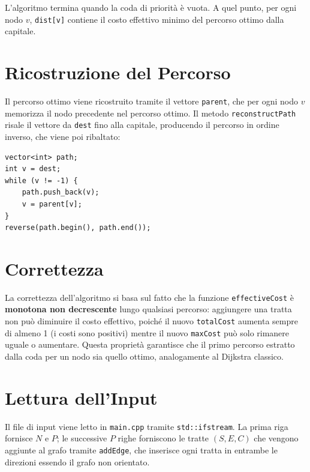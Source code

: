 L'algoritmo termina quando la coda di priorità è vuota. A quel punto, 
per ogni nodo $v$, \texttt{dist[v]} contiene il costo effettivo minimo 
del percorso ottimo dalla capitale.

\section{Ricostruzione del Percorso}

Il percorso ottimo viene ricostruito tramite il vettore \texttt{parent}, 
che per ogni nodo $v$ memorizza il nodo precedente nel percorso ottimo. 
Il metodo \texttt{reconstructPath} risale il vettore da \texttt{dest} 
fino alla capitale, producendo il percorso in ordine inverso, che viene 
poi ribaltato:

\begin{lstlisting}
vector<int> path;
int v = dest;
while (v != -1) {
    path.push_back(v);
    v = parent[v];
}
reverse(path.begin(), path.end());
\end{lstlisting}

\section{Correttezza}

La correttezza dell'algoritmo si basa sul fatto che la funzione 
\texttt{effectiveCost} è \textbf{monotona non decrescente} lungo 
qualsiasi percorso: aggiungere una tratta non può diminuire il costo 
effettivo, poiché il nuovo \texttt{totalCost} aumenta sempre di almeno 
1 (i costi sono positivi) mentre il nuovo \texttt{maxCost} può solo 
rimanere uguale o aumentare. Questa proprietà garantisce che il primo 
percorso estratto dalla coda per un nodo sia quello ottimo, 
analogamente al Dijkstra classico.

\section{Lettura dell'Input}

Il file di input viene letto in \texttt{main.cpp} tramite 
\texttt{std::ifstream}. La prima riga fornisce $N$ e $P$; le successive 
$P$ righe forniscono le tratte $(S, E, C)$ che vengono aggiunte al 
grafo tramite \texttt{addEdge}, che inserisce ogni tratta in entrambe 
le direzioni essendo il grafo non orientato.